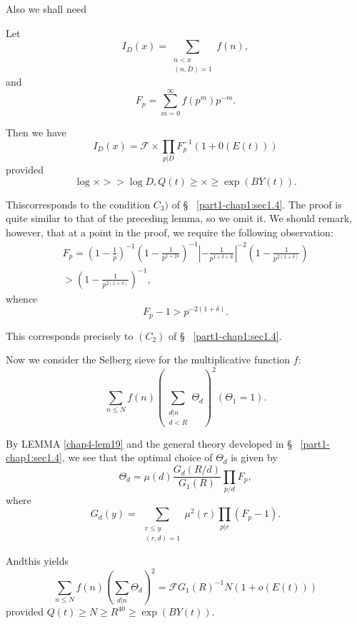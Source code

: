 Also we shall need
\begin{Lemma}\label{chap4-lem19}%
  Let 
  $$
  I_D(x) = \sum_{\substack{n < x \\ (n, D) = 1}} f(n),
  $$
  and
  $$
  F_p = \sum_{m = 0}^{\infty} f(p^m ) p^{-m}.
  $$ 


Then we have
$$
 I_D(x) = \mathscr{F} \times \prod_{p | D} F^{-1}_p ( 1 + 0(E(t)))
$$
provided
$$
 \log \times >> \log D, Q(t) \geq \times \geq \exp (BY (t)).
$$
\end{Lemma}

This\pageoriginale corresponds to the condition $C_3)$ of  \S~
\ref{part1-chap1:sec1.4}.  The proof is 
quite similar to that of the preceding lemma, so we omit it. We should
remark, however, that at a point in the proof, we require the
following observation: 
\begin{multline*}
  F_p = \left(1-\frac{1}{p}\right)^{-1} \left(1 - \frac{1}{p^{1+2
      \delta}}\right)^{-1} | - 
  \frac{1}{p^{1+\delta + \text{it}}}|^{-2} \left(1-
  \frac{1}{p^{2(1+\delta)}}\right)\\
   > \left(1- \frac{1}{p^{2(1 + \delta )}}\right)^{-1},
\end{multline*}
whence
$$
F_p - 1 > p^{-2 (1 + \delta)}.
$$

This corresponds precisely to $(C_2) $ of \S~ \ref{part1-chap1:sec1.4}.

Now we consider the Selberg sieve for the multiplicative function $f$:
$$
\sum_{n \leq N} f(n) \left(\sum_{\substack{d | n \\ d < R}}
\Theta_d\right)^2 (\Theta_1 = 1). 
$$

By LEMMA \ref{chap4-lem19} and the general theory developed in \S~
\ref{part1-chap1:sec1.4}, we see 
that the optimal choice of $\Theta_d$ is given by 
\begin{equation*}
  \Theta_d = \mu (d) \frac{G_d (R/d)}{G_1 (R)} \prod_{p/d} F_p,
  \tag{4.1.15} \label{eq4.1.15}
\end{equation*}
where
$$
G_d(y) = ~ \sum_{\substack{r \leq y \\ (r, d) = 1}} \mu^2  (r)
\prod_{p | r} (F_p - 1). 
$$

And\pageoriginale this yields
\begin{equation*}
  \sum_{n \leq N} f(n) \left( \sum_{d | n} \Theta_d \right)^2 = \mathscr{F} G_1
  (R)^{-1} N (1 + o (E(t))) \tag{4.1.16} \label{eq4.1.16}
\end{equation*}
provided $Q(t) \geq N \geq R^{40} \geq \exp (BY(t))$.

